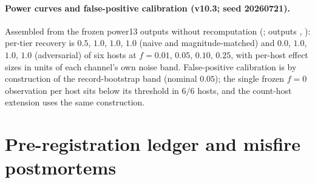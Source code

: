 \documentclass[12pt]{article}
\begin{document}
\paragraph{Power curves and false-positive calibration (v10.3; seed
20260721).} Assembled from the frozen power13 outputs without recomputation
(; outputs ,
): per-tier recovery is $0.5$, $1.0$, $1.0$, $1.0$ (naive and
magnitude-matched) and $0.0$, $1.0$, $1.0$, $1.0$ (adversarial) of six hosts
at $f = 0.01$, $0.05$, $0.10$, $0.25$, with per-host effect sizes in units of
each channel's own noise band. False-positive calibration is by construction
of the record-bootstrap band (nominal $0.05$); the single frozen $f{=}0$
observation per host sits below its threshold in $6/6$ hosts, and the
count-host extension uses the same construction.

\section{Pre-registration ledger and misfire postmortems}
\label{s:prereg}
\end{document}
